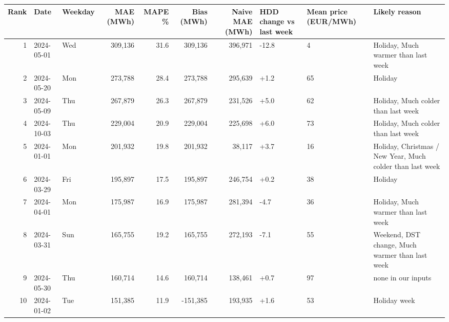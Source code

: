 \begin{tabular}{rllrrrrlll}
\toprule
Rank & Date & Weekday & MAE (MWh) & MAPE \% & Bias (MWh) & Naive MAE (MWh) & HDD change vs last week & Mean price (EUR/MWh) & Likely reason \\
\midrule
1 & 2024-05-01 & Wed & 309,136 & 31.6 & 309,136 & 396,971 & -12.8 & 4 & Holiday, Much warmer than last week \\
2 & 2024-05-20 & Mon & 273,788 & 28.4 & 273,788 & 295,639 & +1.2 & 65 & Holiday \\
3 & 2024-05-09 & Thu & 267,879 & 26.3 & 267,879 & 231,526 & +5.0 & 62 & Holiday, Much colder than last week \\
4 & 2024-10-03 & Thu & 229,004 & 20.9 & 229,004 & 225,698 & +6.0 & 73 & Holiday, Much colder than last week \\
5 & 2024-01-01 & Mon & 201,932 & 19.8 & 201,932 & 38,117 & +3.7 & 16 & Holiday, Christmas / New Year, Much colder than last week \\
6 & 2024-03-29 & Fri & 195,897 & 17.5 & 195,897 & 246,754 & +0.2 & 38 & Holiday \\
7 & 2024-04-01 & Mon & 175,987 & 16.9 & 175,987 & 281,394 & -4.7 & 36 & Holiday, Much warmer than last week \\
8 & 2024-03-31 & Sun & 165,755 & 19.2 & 165,755 & 272,193 & -7.1 & 55 & Weekend, DST change, Much warmer than last week \\
9 & 2024-05-30 & Thu & 160,714 & 14.6 & 160,714 & 138,461 & +0.7 & 97 & none in our inputs \\
10 & 2024-01-02 & Tue & 151,385 & 11.9 & -151,385 & 193,935 & +1.6 & 53 & Holiday week \\
\bottomrule
\end{tabular}
